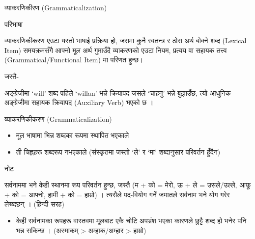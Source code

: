 \documentclass[aspectratio=169, 12pt]{beamer}
\begin{document}
\begin{frame}[fragile]{व्याकरणिकीरण (Grammaticalization)}{}

\begin{block}{परिभाषा}

व्याकरणिकीकरण एउटा यस्तो भाषाई प्रक्रिया हो, जसमा कुनै स्वतन्त्र र ठोस अर्थ बोक्ने शब्द (Lexical Item) समयक्रमसँगै आफ्नो मूल अर्थ गुमाउँदै व्याकरणको एउटा नियम, प्रत्यय वा सहायक तत्त्व (Grammatical/Functional Item) मा परिणत हुन्छ।

\end{block}

जस्तै-

अङ्ग्रेजीमा `will' शब्द पहिले `willan' भन्ने क्रियापद जसले `चाहनु' भन्ने बुझाउँछ, त्यो आधुनिक अङ्ग्रेजीमा सहायक क्रियापद (Auxiliary Verb) भएको छ ।

\end{frame}

\begin{frame}[fragile]{व्याकरणिकीकरण (Grammaticalization)}{}

\begin{itemize}
\item मूल भाषामा भिन्न शब्दका  रूपमा स्थापित भएकाले


\item ती चिह्नहरू शब्दरूप नभएकाले (संस्कृतमा जस्तो `ले' र `मा' शब्दानुसार परिवर्तन हुँदैन)


\end{itemize}
\begin{block}{नोट}

सर्वनाममा भने केही स्थानमा रूप परिवर्तन हुन्छ, जस्तै (म + को = मेरो, ऊ + ले = उसले/उल्ले, आफू + को = आफ्नो, हामी + को = हाम्रो)  । त्यसैले पद-वियोग गर्ने जमातले सर्वनाम भने योग गरेर लेख्दछन् । (हिन्दी सरह)

\end{block}

\begin{itemize}
\item केही सर्वनामका रूपहरू वास्तवमा मूलबाट एकै चोटि अपभ्रंश भएका कारणले छुट्टै शब्द हो भनेर पनि भन्न सकिन्छ । (अस्माकम् > अम्हाक/अम्हार > हाम्रो)


\end{itemize}
\end{frame}
\end{document}
